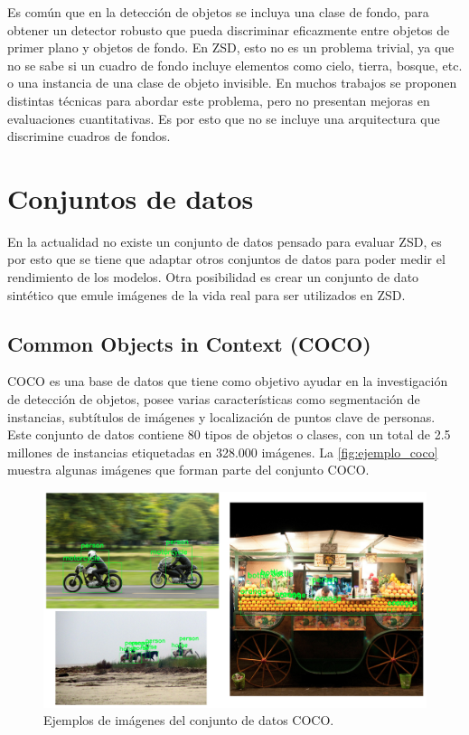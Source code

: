 Es común que en la detección de objetos se incluya una clase de fondo, para obtener un detector robusto que pueda discriminar eficazmente entre objetos de primer plano y objetos de fondo. En ZSD, esto no es un problema trivial, ya que no se sabe si un cuadro de fondo incluye elementos como cielo, tierra, bosque, etc. o una instancia de una clase de objeto invisible. En muchos trabajos se proponen distintas técnicas para abordar este problema, pero no presentan mejoras en evaluaciones cuantitativas. Es por esto que no se incluye una arquitectura que discrimine cuadros de fondos.

\section{Conjuntos de datos} \label{sec:conjuntosdedatos}

En la actualidad no existe un conjunto de datos pensado para evaluar ZSD, es por esto que se tiene que adaptar otros conjuntos de datos para poder medir el rendimiento de los modelos. Otra posibilidad es crear un conjunto de dato sintético que emule imágenes de la vida real para ser utilizados en ZSD.

\subsection{Common Objects in Context (COCO)}\label{ssec:commonobjectsincontext}

COCO es una base de datos que tiene como objetivo ayudar en la investigación de detección de objetos, posee varias características como segmentación de instancias, subtítulos de imágenes y localización de puntos clave de personas. Este conjunto de datos contiene 80 tipos de objetos o  clases, con un total de 2.5 millones de instancias etiquetadas en 328.000 imágenes. La \autoref{fig:ejemplo_coco} muestra algunas imágenes que forman parte del conjunto COCO.

\begin{figure}
	\begin{center}
		\centering
		\includegraphics[width=1\textwidth]{img/coco_ejemplo.png}
		\caption{Ejemplos de imágenes del conjunto de datos COCO.}
		\label{fig:ejemplo_coco}
	\end{center}	
\end{figure}

